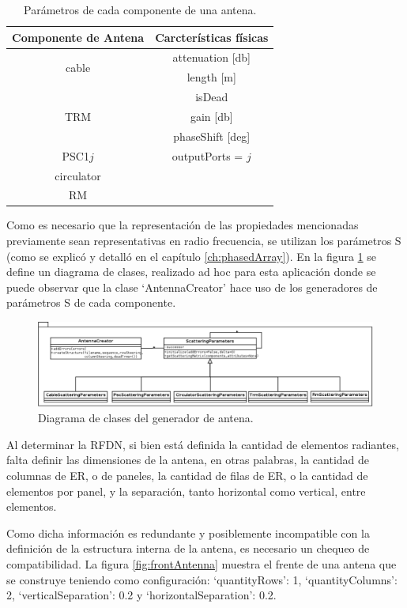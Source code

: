 \begin{table}[H]
  \footnotesize
  \centering
  \begin{tabular}{|c|c|}
	\hline
	\textbf{Componente de Antena} & \textbf{Carcterísticas físicas} \tabularnewline \hline 
	\multirow{2}{*}{cable} &  attenuation [db] \tabularnewline \cline{2-2}
	 & length [m] \tabularnewline \hline 
	\multirow{3}{*}{TRM} & isDead \tabularnewline \cline{2-2}
	 & gain [db]\tabularnewline \cline{2-2}
	 & phaseShift [deg] \tabularnewline \hline 
	PSC1$j$ & outputPorts = $j$ \tabularnewline \hline 
	circulator & \tabularnewline \hline 
	RM & \tabularnewline \hline 
  \end{tabular}
  \caption{Parámetros de cada componente de una antena.}
  \label{tab:propertiesOfComponents}
\end{table}

Como es necesario que la representación de las propiedades mencionadas previamente sean representativas en radio frecuencia,
se utilizan los parámetros S (como se explicó y detalló en el capítulo \ref{ch:phasedArray}). En la figura \ref{fig:creationPackage} 
se define un diagrama de clases, realizado ad hoc para esta aplicación donde se puede observar que la clase \enquote*{AntennaCreator}
hace uso de los generadores de parámetros S de cada componente.

\begin{figure}
 \centering
 \includegraphics[width=15cm]{gfx/creationPackage.png}
 \caption{Diagrama de clases del generador de antena.}
 \label{fig:creationPackage}
\end{figure}
Al determinar la RFDN, si bien está definida la cantidad de elementos radiantes, falta definir las dimensiones de la antena, 
en otras palabras, la cantidad de columnas de ER, o de paneles, la cantidad de filas de ER, o la cantidad de elementos por
panel, y la separación, tanto horizontal como vertical, entre elementos. 

Como dicha información es redundante y posiblemente incompatible con la definición de la estructura interna de la antena, es 
necesario un chequeo de compatibilidad. La figura \ref{fig:frontAntenna} muestra el frente de una antena que se construye 
teniendo como configuración: \enquote*{quantityRows}: 1, \enquote*{quantityColumns}: 2, \enquote*{verticalSeparation}: 0.2 y
\enquote*{horizontalSeparation}: 0.2.

